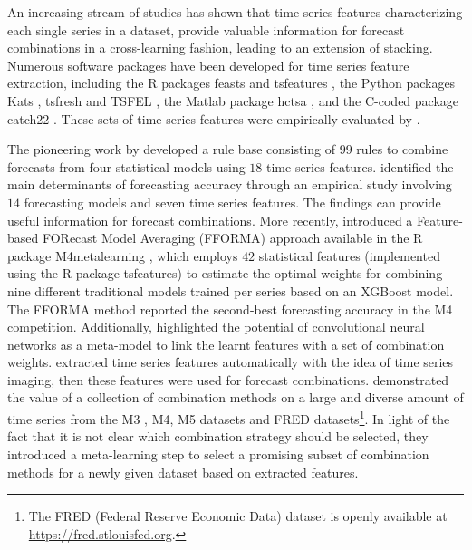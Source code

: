 \documentclass[a4paper,11pt]{article}
\newcommand{\pkg}[1]{{\normalfont\fontseries{b}\selectfont #1}}
\let\proglang=\textsf
\begin{document}
An increasing stream of studies has shown that time series features characterizing each single series in a dataset, provide valuable information for forecast combinations in a cross-learning fashion, leading to an extension of stacking. Numerous software packages have been developed for time series feature extraction, including the \proglang{R} packages \pkg{feasts} \citep{rfeasts} and \pkg{tsfeatures} \citep{rtsfeatures}, the \proglang{Python} packages \pkg{Kats} \citep{pKats}, \pkg{tsfresh} \citep{Christ2018-vi} and \pkg{TSFEL} \citep{Barandas2020-vr}, the \proglang{Matlab} package \pkg{hctsa} \citep{Fulcher2017-uf}, and the \proglang{C}-coded package \pkg{catch22} \citep{Lubba2019-ds}. These sets of time series features were empirically evaluated by \citet{Henderson2021-gl}.

The pioneering work by \citet{Collopy1992-ey} developed a rule base consisting of $99$ rules to combine forecasts from four statistical models using $18$ time series features. \citet{Petropoulos2014-uy} identified the main determinants of forecasting accuracy through an empirical study involving $14$ forecasting models and seven time series features. The findings can provide useful information for forecast combinations. More recently, \citet{Montero-Manso2020-tq} introduced a Feature-based FORecast Model Averaging (FFORMA) approach available in the \proglang{R} package \pkg{M4metalearning} \citep{rfforma}, which employs $42$ statistical features (implemented using the \proglang{R} package \pkg{tsfeatures}) to estimate the optimal weights for combining nine different traditional models trained per series based on an XGBoost model. The FFORMA method reported the second-best forecasting accuracy in the M4 competition. Additionally, \citet{Ma2021-np} highlighted the potential of convolutional neural networks as a meta-model to link the learnt features with a set of combination weights. \citet{Li2020-od} extracted time series features automatically with the idea of time series imaging, then these features were used for forecast combinations. \citet{Gastinger2021-ey} demonstrated the value of a collection of combination methods on a large and diverse amount of time series from the M3 \citep{Makridakis2000-he}, M4, M5 \citep{Makridakis2020-fn} datasets and FRED datasets\footnote{The FRED (Federal Reserve Economic Data) dataset is openly available at \url{https://fred.stlouisfed.org}.}. In light of the fact that it is not clear which combination strategy should be selected, they introduced a meta-learning step to select a promising subset of combination methods for a newly given dataset based on extracted features.
\end{document}
